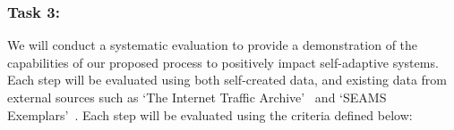 \documentclass[12pt]{article}
\newcommand{\dan}[1]{\textcolor{blue}{{\it [Dan says: #1]}}}
\begin{document}








\vspace{-3mm}
\subsubsection{Task 3: \TC} \vspace{-2mm} 

We will conduct a systematic evaluation to provide a demonstration of the capabilities of our proposed process to positively impact self-adaptive systems. Each step will be evaluated using both self-created data, and existing data from external sources such as `The Internet Traffic Archive'~\cite{InternetTrafficArchive_URL} and `SEAMS Exemplars'~\cite{SEAMS_Exemplars_URL}. Each step will be evaluated using the criteria defined below:
\end{document}
